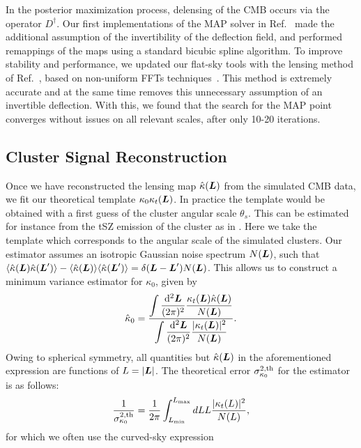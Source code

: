 \documentclass[prd, superscriptaddress, tightenlines, longbibliography, nofootinbib, eqsecnum, amsfonts, amsmath, floatfix, twocolumn, notitlepage]{revtex4-2}
\newcommand{\diff}{\mathop{}\!\mathrm{d}}
\begin{document}
In the posterior maximization process, delensing of the CMB occurs via the operator $D^\dagger$. Our first implementations of the MAP solver in Ref.~\cite{Carron:2017mqf} made the additional assumption of the invertibility of the deflection field, and performed remappings of the maps using a standard bicubic spline algorithm. To improve stability and performance, we updated our flat-sky tools with the lensing method of Ref.~\cite{Reinecke:2023gtp}, based on non-uniform FFTs techniques~\cite{Barnett2019, Barnett2020}. This method is extremely accurate and at the same time removes this unnecessary assumption of an invertible deflection. With this, we found that the search for the MAP point converges without issues on all relevant scales, after only 10-20 iterations.


\subsection{Cluster Signal Reconstruction}
\label{sec:cluster_mass}

Once we have reconstructed the lensing map $\hat{\kappa} (\vL)$ from the simulated CMB data, we fit our theoretical template $\kappa_0\kappa_t (\vL)$.
In practice the template would be obtained with a first guess of the cluster angular scale $\theta_s$. This can be estimated for instance from the tSZ emission of the cluster as in \cite{Zubeldia:2019brr}. Here we take the template which corresponds to the angular scale of the simulated clusters.
Our estimator assumes an isotropic Gaussian noise spectrum $N(\vL)$, such that $\langle{\hat{\kappa} (\vL) \hat{\kappa} (\vL')}\rangle - \langle{\hat{\kappa} (\vL)}\rangle \langle \hat{\kappa} (\vL') \rangle = \delta(\vL - \vL') N (\vL)$. This allows us to construct a minimum variance estimator for $\kappa_0$, given by
\begin{equation}\label{eq:kappa_0}
    \hat{\kappa}_0 = \frac{ \displaystyle \int \frac{\diff^2\vL}{(2\pi)^2} \frac{\kappa_t(\vL) \hat \kappa(\vL)}{N(\vL)}}{\displaystyle  \int\frac{\diff^2\vL}{(2\pi)^2} \frac{|\kappa_t(\vL)|^2}{N(\vL)}}.
\end{equation}
Owing to spherical symmetry, all quantities but $\hat{\kappa} (\vL)$ in the aforementioned expression are functions of $L = |\vL|$. The theoretical error $\sigma^{2,\rm th}_{\kappa_0}$ for the estimator is as follows:
\begin{equation}\label{eq:kappa_0_noise}
\frac{1}{\sigma^{2,\text{th}}_{\kappa_0}} = \frac{1}{2\pi}\int_{L_{\rm min}}^{L_{\rm max}} dL L \frac{|\kappa_t(L)|^2}{N(L)},
\end{equation}
for which we often use the curved-sky expression
\end{document}
